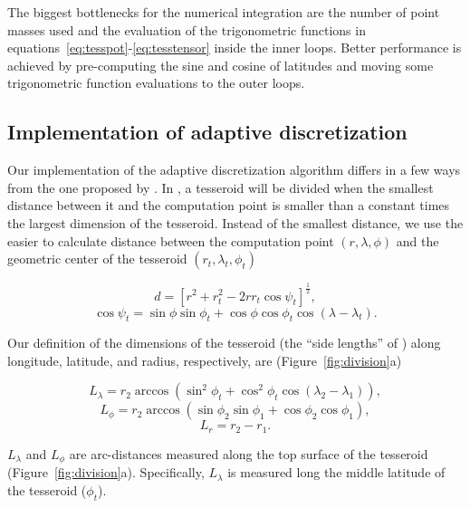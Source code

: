 \documentclass[manuscript,endfloat]{geophysics}
\begin{document}
The biggest bottlenecks for the numerical integration are
the number of point masses used
and the evaluation of the trigonometric functions in
equations~\ref{eq:tesspot}-\ref{eq:tesstensor} inside the inner loops.
Better performance is achieved
by pre-computing the sine and cosine of latitudes
and moving some trigonometric function evaluations
to the outer loops.


\subsection{Implementation of adaptive discretization}

Our implementation of the adaptive discretization algorithm
differs in a few ways from the one proposed by \citet{Li2011}.
In \citet{Li2011},
a tesseroid will be divided when
the smallest distance between it and the computation point
is smaller than a constant times
the largest dimension of the tesseroid.
Instead of the smallest distance,
we use the easier to calculate
distance between
the computation point $(r, \lambda, \phi)$
and the geometric center of the tesseroid
$(r_t, \lambda_t, \phi_t)$

\begin{equation}
    d = \left[
        r^2 + r_t^2 - 2 r r_t \cos\psi_t
        \right]^{\frac{1}{2}} ,
    \label{eq:distance}
\end{equation}
\begin{equation}
    \cos\psi_t =
        \sin\phi\sin\phi_t + \cos\phi\cos\phi_t\cos(\lambda - \lambda_t) .
\end{equation}

Our definition of the dimensions of the tesseroid
(the ``side lengths'' of \citet{Li2011})
along longitude, latitude, and radius, respectively, are
(Figure~\ref{fig:division}a)

\begin{equation}
    L_\lambda = r_2 \arccos(\sin^2\phi_t +
        \cos^2\phi_t\cos(\lambda_2 - \lambda_1)),
    \label{eq:sizelon}
\end{equation}
\begin{equation}
    L_\phi = r_2 \arccos(\sin\phi_2\sin\phi_1 + \cos\phi_2\cos\phi_1),
\end{equation}
\begin{equation}
    L_r = r_2 - r_1.
    \label{eq:sizer}
\end{equation}

\noindent
$L_\lambda$ and $L_\phi$ are arc-distances measured along the top surface of
the tesseroid (Figure~\ref{fig:division}a).
Specifically, $L_\lambda$ is measured long the middle latitude of the
tesseroid ($\phi_t$).
\end{document}
